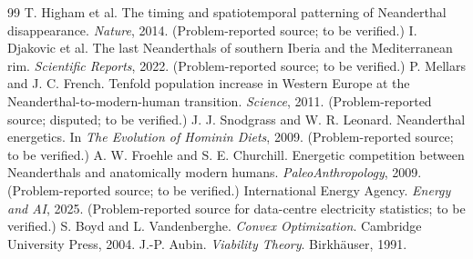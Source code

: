 \documentclass[11pt]{article}
\begin{document}
\begin{thebibliography}{99}
 T. Higham et al. The timing and spatiotemporal patterning of Neanderthal disappearance. \emph{Nature}, 2014. (Problem-reported source; to be verified.)
 I. Djakovic et al. The last Neanderthals of southern Iberia and the Mediterranean rim. \emph{Scientific Reports}, 2022. (Problem-reported source; to be verified.)
 P. Mellars and J. C. French. Tenfold population increase in Western Europe at the Neanderthal-to-modern-human transition. \emph{Science}, 2011. (Problem-reported source; disputed; to be verified.)
 J. J. Snodgrass and W. R. Leonard. Neanderthal energetics. In \emph{The Evolution of Hominin Diets}, 2009. (Problem-reported source; to be verified.)
 A. W. Froehle and S. E. Churchill. Energetic competition between Neanderthals and anatomically modern humans. \emph{PaleoAnthropology}, 2009. (Problem-reported source; to be verified.)
 International Energy Agency. \emph{Energy and AI}, 2025. (Problem-reported source for data-centre electricity statistics; to be verified.)
 S. Boyd and L. Vandenberghe. \emph{Convex Optimization}. Cambridge University Press, 2004.
 J.-P. Aubin. \emph{Viability Theory}. Birkh\"auser, 1991.
\end{thebibliography}
\end{document}
